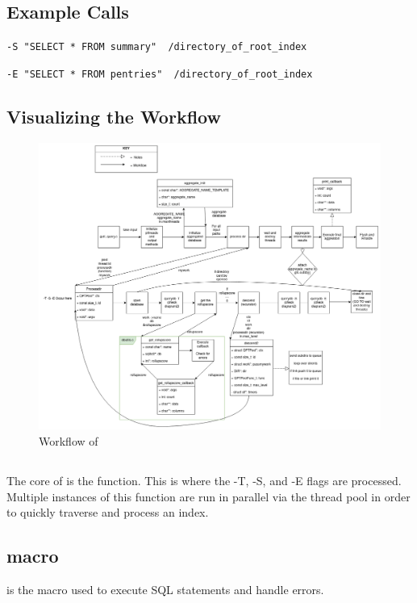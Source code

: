\subsection{Example Calls}

\noindent \gufiquery \texttt{-S "SELECT * FROM summary"
  ~/directory\_of\_root\_index}

\noindent \gufiquery \texttt{-E "SELECT * FROM pentries"
  ~/directory\_of\_root\_index}

\subsection{Visualizing the Workflow}
\begin{figure} [H]
  \centering
  \includegraphics[width=\textwidth]{images/gufi_query.png}
  \caption{\label{fig:gufi_query} Workflow of \gufiquery}
\end{figure}

\subsection{\processdir}
The core of \gufiquery is the \processdir function. This is where the
-T, -S, and -E flags are processed. Multiple instances of this
function are run in parallel via the thread pool in order to quickly
traverse and process an index.

\subsection{\querydb macro}
\querydb is the macro used to execute SQL statements and handle errors.


